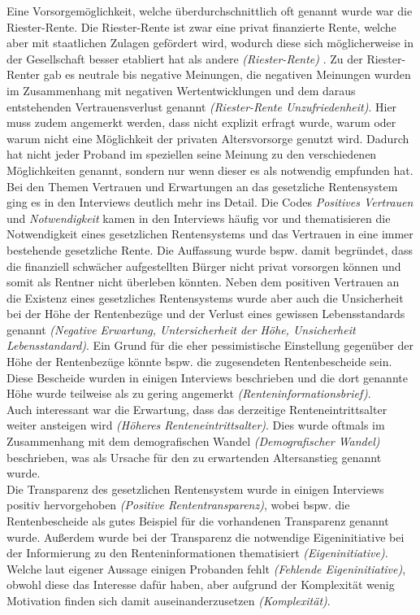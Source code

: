 \documentclass{hsflensburg}
\begin{document}
	Eine Vorsorgemöglichkeit, welche
	überdurchschnittlich oft genannt wurde war die Riester-Rente. Die Riester-Rente ist zwar eine privat finanzierte
	Rente, welche aber mit staatlichen Zulagen gefördert wird, wodurch diese sich möglicherweise in der Gesellschaft besser 
	etabliert hat als andere \textit{(Riester-Rente)} \cite{riester}. Zu der Riester-Renter gab es neutrale bis negative Meinungen, die negativen Meinungen
	wurden im Zusammenhang mit negativen Wertentwicklungen und dem daraus entstehenden Vertrauensverlust genannt
	\textit{(Riester-Rente Unzufriedenheit)}.
	Hier muss zudem angemerkt werden, dass nicht explizit  erfragt wurde, warum oder warum nicht eine Möglichkeit der privaten 					Altersvorsorge genutzt wird. Dadurch hat nicht jeder Proband im speziellen seine Meinung zu den verschiedenen 
	Möglichkeiten genannt, sondern nur wenn dieser es als notwendig empfunden hat. \\

	Bei den Themen Vertrauen und Erwartungen an das gesetzliche Rentensystem ging es in den Interviews deutlich mehr ins Detail.
	Die Codes \textit{Positives Vertrauen} und \textit{Notwendigkeit} kamen in den Interviews häufig vor und thematisieren die 
	Notwendigkeit eines gesetzlichen Rentensystems und das Vertrauen in eine immer bestehende gesetzliche Rente.
	Die Auffassung wurde bspw. damit begründet, dass die finanziell schwächer aufgestellten Bürger nicht privat vorsorgen können und
	somit als Rentner nicht überleben könnten. Neben dem positiven Vertrauen an die Existenz eines gesetzliches Rentensystems
	wurde aber auch die Unsicherheit bei der Höhe der Rentenbezüge und der Verlust eines gewissen Lebensstandards genannt
	\textit{(Negative Erwartung, Untersicherheit der Höhe, Unsicherheit Lebensstandard)}. Ein Grund für die eher pessimistische
	Einstellung gegenüber der Höhe der Rentenbezüge könnte bspw. die zugesendeten Rentenbescheide sein. Diese Bescheide
	wurden in einigen Interviews beschrieben und die dort genannte Höhe wurde teilweise als zu gering angemerkt 
	\textit{(Renteninformationsbrief)}.\\
	
	Auch interessant war die Erwartung, dass das derzeitige Renteneintrittsalter weiter ansteigen wird \textit{(Höheres Renteneintrittsalter)}.
	Dies wurde oftmals im Zusammenhang mit dem demografischen Wandel \textit{(Demografischer Wandel)} beschrieben, was als 
	Ursache für den zu erwartenden Altersanstieg genannt wurde. \\

	Die Transparenz des gesetzlichen Rentensystem wurde in einigen Interviews positiv hervorgehoben \textit{(Positive Rententransparenz)}, 			wobei bspw. die Rentenbescheide als gutes Beispiel für die vorhandenen Transparenz genannt wurde. Außerdem wurde bei der 				Transparenz die notwendige Eigeninitiative bei der Informierung zu den Renteninformationen thematisiert \textit{(Eigeninitiative)}. 				Welche laut eigener Aussage einigen Probanden fehlt \textit{(Fehlende Eigeninitiative)}, obwohl diese das Interesse dafür haben, aber 				aufgrund der Komplexität wenig Motivation finden sich damit auseinanderzusetzen \textit{(Komplexität)}. \\
\end{document}
